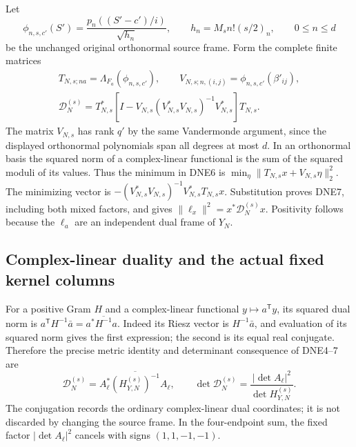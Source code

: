 \documentclass[11pt,a4paper]{article}
\begin{document}
Let
\[
 \phi_{n,s,c'}(S')
 =\frac{p_n((S'-c')/i)}{\sqrt{h_n}},\qquad
 h_n=M_sn!(s/2)_n,\qquad 0\le n\le d
\]
be the unchanged original orthonormal source frame. Form the
complete finite matrices
\[
 \begin{gathered}
 T_{N,s;na}=\Lambda_{F_a}(\phi_{n,s,c'}),\qquad
 V_{N,s;n,(i,j)}=\phi_{n,s,c'}(\beta'_{ij}),\\
 \mathcal D_N^{(s)}
 =T_{N,s}^*
  \left[I-V_{N,s}(V_{N,s}^*V_{N,s})^{-1}V_{N,s}^*\right]T_{N,s}.
 \end{gathered}
 \tag{DNE7}
\]
The matrix $V_{N,s}$ has rank $q'$ by the same Vandermonde
argument, since the displayed orthonormal polynomials span
all degrees at most $d$. In an orthonormal basis the squared
norm of a complex-linear functional is the sum of the
squared moduli of its values. Thus the minimum in DNE6 is
$\min_\eta\|T_{N,s}x+V_{N,s}\eta\|_2^2$.
The minimizing vector is
$-(V_{N,s}^*V_{N,s})^{-1}V_{N,s}^*T_{N,s}x$.
Substitution proves DNE7, including both mixed factors,
and gives $\|\ell_x\|^2=x^*\mathcal D_N^{(s)}x$.
Positivity follows because the $\ell_a$ are an independent
dual frame of $Y_N$.

\subsection{Complex-linear duality and the actual fixed kernel columns}

For a positive Gram $H$ and a complex-linear functional
$y\mapsto a^{\mathsf T}y$, its squared dual norm is
$a^{\mathsf T}H^{-1}\bar a
 =a^*\overline{H^{-1}}a$.
Indeed its Riesz vector is $H^{-1}\bar a$, and evaluation
of its squared norm gives the first expression; the second
is its equal real conjugate. Therefore the precise metric
identity and determinant consequence of DNE4--7 are
\[
 \mathcal D_N^{(s)}
   =A_\ell^*\overline{(H_{Y,N}^{(s)})^{-1}}A_\ell,\qquad
 \det\mathcal D_N^{(s)}
   =\frac{|\det A_\ell|^2}{\det H_{Y,N}^{(s)}}.
 \tag{DNE8}
\]
The conjugation records the ordinary complex-linear dual
coordinates; it is not discarded by changing the source frame.
In the four-endpoint sum, the fixed factor $|\det A_\ell|^2$
cancels with signs $(1,1,-1,-1)$.
\end{document}
